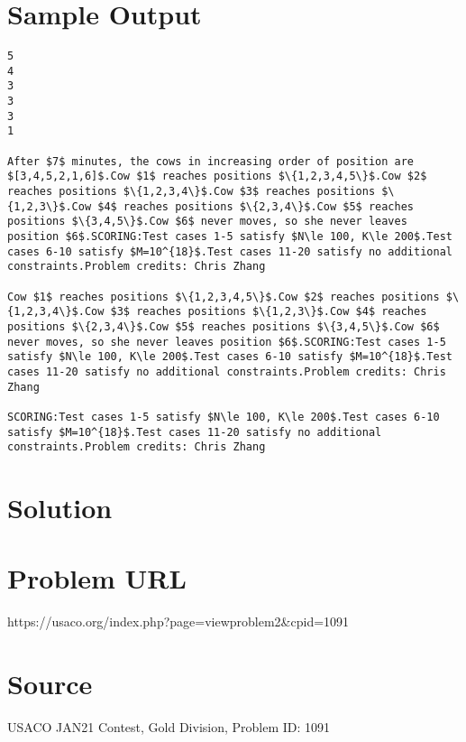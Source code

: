 \documentclass[12pt]{article}
\begin{document}
\section*{Sample Output}
\begin{verbatim}
5
4
3
3
3
1

After $7$ minutes, the cows in increasing order of position are $[3,4,5,2,1,6]$.Cow $1$ reaches positions $\{1,2,3,4,5\}$.Cow $2$ reaches positions $\{1,2,3,4\}$.Cow $3$ reaches positions $\{1,2,3\}$.Cow $4$ reaches positions $\{2,3,4\}$.Cow $5$ reaches positions $\{3,4,5\}$.Cow $6$ never moves, so she never leaves position $6$.SCORING:Test cases 1-5 satisfy $N\le 100, K\le 200$.Test cases 6-10 satisfy $M=10^{18}$.Test cases 11-20 satisfy no additional constraints.Problem credits: Chris Zhang

Cow $1$ reaches positions $\{1,2,3,4,5\}$.Cow $2$ reaches positions $\{1,2,3,4\}$.Cow $3$ reaches positions $\{1,2,3\}$.Cow $4$ reaches positions $\{2,3,4\}$.Cow $5$ reaches positions $\{3,4,5\}$.Cow $6$ never moves, so she never leaves position $6$.SCORING:Test cases 1-5 satisfy $N\le 100, K\le 200$.Test cases 6-10 satisfy $M=10^{18}$.Test cases 11-20 satisfy no additional constraints.Problem credits: Chris Zhang

SCORING:Test cases 1-5 satisfy $N\le 100, K\le 200$.Test cases 6-10 satisfy $M=10^{18}$.Test cases 11-20 satisfy no additional constraints.Problem credits: Chris Zhang
\end{verbatim}

\section*{Solution}


\section*{Problem URL}
https://usaco.org/index.php?page=viewproblem2&cpid=1091

\section*{Source}
USACO JAN21 Contest, Gold Division, Problem ID: 1091
\end{document}
